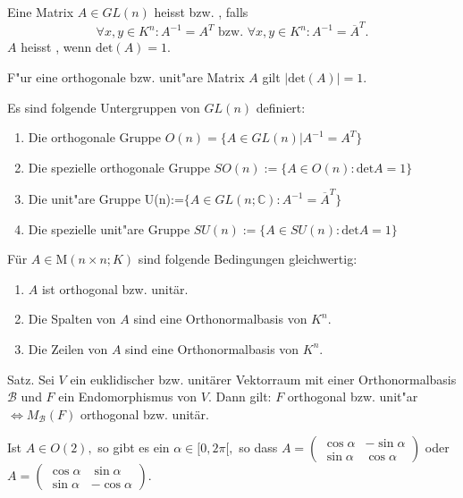 \documentclass[11pt, a4paper]{article}
\begin{document}
\begin{definition}
Eine Matrix $A \in GL(n)$ heisst  bzw. , falls 
$$
\forall x, y \in K^n: A^{-1} = A^T
\text{ bzw. }
\forall x, y \in K^n :A^{-1} =\overline{A}^T.
$$
$A$ heisst , wenn $\mathrm{det}(A) = 1$.
\end{definition}

\begin{remark}
F"ur eine orthogonale bzw. unit"are Matrix $A$ gilt $|\mathrm{det}(A)| = 1$.
\end{remark}

\begin{definition}
Es sind folgende Untergruppen von $GL(n)$ definiert:
\begin{enumerate}
\item Die orthogonale Gruppe $O(n) = \{ A \in GL(n) | A^{-1} = A^T \}$
\item Die spezielle orthogonale Gruppe $SO(n):=\{A \in O(n): \mathrm{det} A=1\}$
\item Die unit"are Gruppe U(n):=$\{A \in GL(n ; \mathbb{C}): A^{-1}= \overline{A}^T\}$
\item Die spezielle unit"are Gruppe $SU(n):=\{A \in SU(n): \mathrm{det} A=1\}$
\end{enumerate}

\end{definition}

\begin{remark}
Für \(A \in \mathrm{M}(n \times n ; K)\) sind folgende Bedingungen gleichwertig:
\begin{enumerate}
\item \(A\) ist orthogonal bzw. unitär.
\item Die Spalten von \(A\) sind eine Orthonormalbasis von \(K^{n}\).
\item Die Zeilen von \(A\) sind eine Orthonormalbasis von \(K^{n}\).
\end{enumerate}
\end{remark}


\begin{theorem}
Satz. Sei \(V\) ein euklidischer bzw. unitärer Vektorraum mit einer Orthonormalbasis \(\mathcal{B}\) und \(F\) ein Endomorphismus von \(V\). Dann gilt:
$F$ orthogonal bzw. unit"ar $\Leftrightarrow M_{\mathcal{B}}(F)$ orthogonal bzw. unitär.
\end{theorem}

\begin{lemma}
Ist \(A \in O(2),\) so gibt es ein \(\alpha \in[0,2 \pi[,\) so dass
$A=\left(\begin{array}{cc}\cos \alpha  & -\sin \alpha 
\\ \sin \alpha & \cos \alpha\end{array}\right)$ 
oder 
$A=\left(\begin{array}{cc}\cos \alpha & \sin \alpha \\ \sin \alpha & -\cos \alpha\end{array}\right)$.
\end{lemma}
\end{document}
